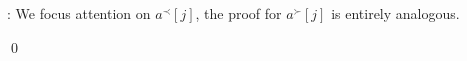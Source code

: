 : We focus attention on $a^{\prec}[j]$, the proof for $a^{\succ}[j]$ 
is entirely analogous.

\qed


% 



